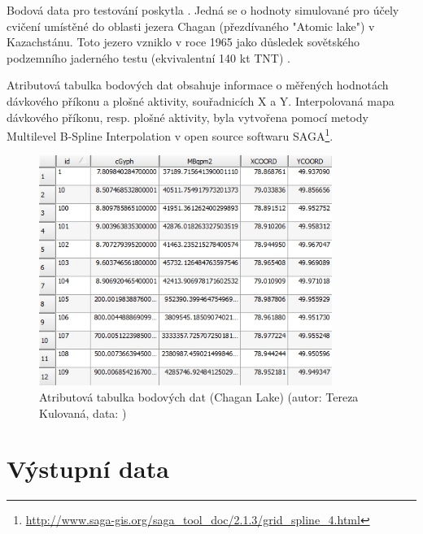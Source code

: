 Bodová data pro testování poskytla . Jedná se o hodnoty simulované pro účely cvičení umístěné do oblasti jezera Chagan (přezdívaného "Atomic lake") v Kazachstánu. Toto jezero vzniklo v roce 1965 jako důsledek sovětského podzemního jaderného testu (ekvivalentní 140 kt TNT) \cite{Nordyke2000}.

Atributová tabulka bodových dat obsahuje informace o měřených hodnotách dávkového příkonu a plošné aktivity, souřadnicích X a Y. Interpolovaná mapa dávkového příkonu, resp. plošné aktivity, byla vytvořena pomocí metody Multilevel B-Spline Interpolation v open source  softwaru SAGA\footnote{\url{http://www.saga-gis.org/saga_tool_doc/2.1.3/grid_spline_4.html}}.
  
\begin{figure}[H] \centering
      \includegraphics[width=270pt]{./pictures/chagan_attr.jpg}
      \caption[Atributová tabulka bodových dat (Chagan Lake)]{Atributová tabulka bodových dat (Chagan Lake) (autor: Tereza Kulovaná, data: )}
      \label{fig:attributes}
\end{figure}

\section{Výstupní data}


